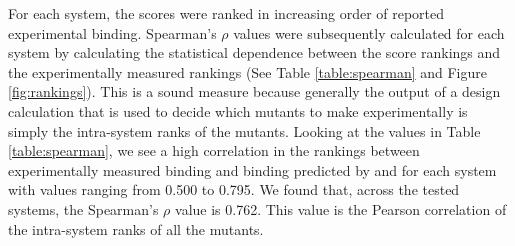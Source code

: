 For each system, the \ks scores were ranked in increasing order of reported experimental binding. Spearman's $\rho$ values were subsequently calculated for each system by calculating the statistical dependence between the \ks score rankings and the experimentally measured rankings (See Table \ref{table:spearman} and Figure \ref{fig:rankings}). This is a sound measure because generally the output of a design calculation that is used to decide which mutants to make experimentally is simply the intra-system ranks of the mutants. Looking at the values in Table \ref{table:spearman}, we see a high correlation in the rankings between experimentally measured binding and binding predicted by  and \ks for each system with values ranging from 0.500 to 0.795. We found that, across the tested systems, the Spearman's $\rho$ value is 0.762. This value is the Pearson correlation of the intra-system ranks of all the mutants.      



